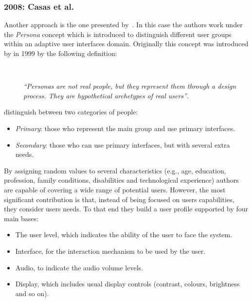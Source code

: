 
\subsubsection{2008: Casas et al.}
\label{sec:casas}

Another approach is the one presented by~\citet{casas_user_2008}. In this case 
the authors work under the \textit{Persona} concept which is introduced to 
distinguish different user groups within an adaptive user interfaces domain. 
Originally this concept was introduced by \citeauthor{cooper_inmates_2004} in 
1999 by the following definition:

\begin{description}
  \item[] \hfill \\
  \begin{mdframed}[hidealllines=true,backgroundcolor=gray!20]
  \textit{``Personas are not real people, but they represent them through a design 
  process. They are hypothetical archetypes of real users''}. 
  \end{mdframed}
\end{description}

\citeauthor{casas_user_2008} distinguish between two categories of people:

\begin{itemize}
 \item \textit{Primary}: those who represent the main group and use primary 
 interfaces. 
 \item \textit{Secondary}: those who can use primary interfaces, but with 
 several extra needs.
\end{itemize}

By assigning random values to several characteristics (e.g., age, education,
profession, family conditions, disabilities and technological experience) 
authors are capable of covering a wide range of potential users. However, the 
most significant contribution is that, instead of being focused on users 
capabilities, they consider users needs. To that end they build a user 
profile supported by four main bases: 

\begin{itemize}
 \item The user level, which indicates the ability of the user to face the 
 system.
 \item Interface, for the interaction mechanism to be used by the user.
 \item Audio, to indicate the audio volume levels.
 \item Display, which includes usual display controls (contrast, colours, 
 brightness and so on).
\end{itemize}

